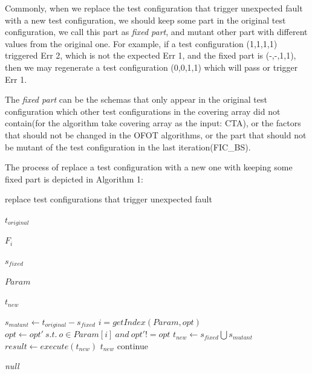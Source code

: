 \documentclass{sig-alternate}
\begin{document}
Commonly, when we replace the test configuration that trigger unexpected fault with a new test configuration, we should keep some part in the original test configuration, we call this part as \emph{fixed part}, and mutant other part with different values from the original one. For example, if a test configuration (1,1,1,1) triggered Err 2, which is not the expected Err 1, and the fixed part is (-,-,1,1), then we may regenerate a test configuration (0,0,1,1) which will pass or trigger Err 1.

The \emph{fixed part} can be the schemas that only appear in the original test configuration which other test configurations in the covering array did not contain(for the algorithm take covering array as the input: CTA), or the factors that should not be changed in the OFOT algorithms, or the part that should not be mutant of the test configuration in the last iteration(FIC\_BS).

The process of replace a test configuration with a new one with keeping some fixed part is depicted in Algorithm 1:

\begin{algorithm}
  \caption{replace test configurations that trigger unexpected fault}
  \begin{algorithmic}[1]
     \Require

     $t_{original}$ 

     $F_{i}$ 

     $s_{fixed}$ 

     $Param$ 


     \Ensure  $t_{new}$ 

       \State $s_{mutant} \leftarrow t_{original} - s_{fixed}$
          \State $i = getIndex(Param,opt) $
          \State $opt \leftarrow opt' \ s.t.\ o \in Param[i]\ and\ opt' != opt$
       \EndFor
       \State $t_{new} \leftarrow s_{fixed} \bigcup s_{mutant} $
       \State $result \leftarrow execute(t_{new})$
         \State \Return $t_{new}$
       \Else
         \State continue
       \EndIf
     \EndWhile

     \State \Return \emph{null}
  \end{algorithmic}
\end{algorithm}
\end{document}
